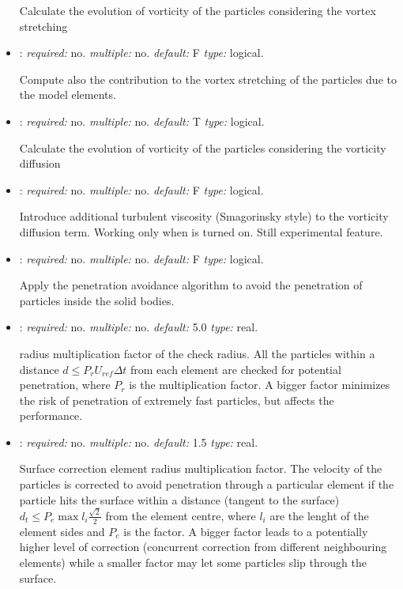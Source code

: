 \begin{itemize}
Calculate the evolution of vorticity of the particles considering the 
vortex stretching

\item {}: \textit{required:} no. 
\textit{multiple:} no. \textit{default:} F \textit{type:} logical.

Compute also the contribution to the vortex stretching of the particles 
due to the model elements. 

\item {}: \textit{required:} no. \textit{multiple:} no. 
\textit{default:} T \textit{type:} logical.

Calculate the evolution of vorticity of the particles considering the vorticity diffusion

\item {}: \textit{required:} no. \textit{multiple:} no. 
\textit{default:} F \textit{type:} logical.

Introduce additional turbulent viscosity (Smagorinsky style) to the vorticity 
diffusion term. Working only when  is turned on. Still experimental feature. 

\item {}: \textit{required:} no. \textit{multiple:} no. 
\textit{default:} F \textit{type:} logical.

Apply the penetration avoidance algorithm to avoid the penetration of particles 
inside the solid bodies.

\item {}: \textit{required:} no. 
\textit{multiple:} no. \textit{default:} 5.0 \textit{type:} real.

radius multiplication factor of the check radius. All the particles within a 
distance $d\leq P_r U_{ref} \Delta t$ from each element are checked for 
potential penetration, where $P_r$ is the multiplication factor. 
A bigger factor minimizes the risk of penetration of extremely fast particles, 
but affects the performance. 

\item {}: \textit{required:} no. 
\textit{multiple:} no. \textit{default:} 1.5 \textit{type:} real.

Surface correction element radius multiplication factor.
The velocity of the particles is corrected to avoid penetration through a 
particular element if the particle hits the surface within a distance 
(tangent to the surface) $d_t \leq P_e \max{l_i} \frac{\sqrt{2}}{2}$ 
from the element centre, where $l_i$ are the lenght of the element sides 
and $P_e$ is the factor. 
A bigger factor leads to a potentially higher level of correction 
(concurrent correction from different neighbouring elements) 
while a smaller factor may let some particles slip through the surface. 


\end{itemize}
